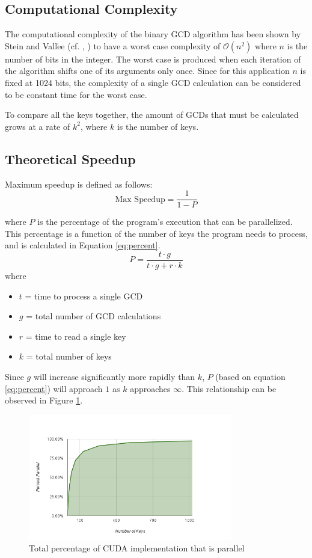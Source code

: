 \documentclass[12pt]{ucthesis}
\begin{document}
\subsection{Computational Complexity}
The computational complexity of the binary GCD algorithm has been shown by 
Stein and Vall$\acute{\text{e}}$e (cf. \cite{stein1967computational}, 
\cite{vallee1998complete}) to have a worst case complexity of $\mathcal{O}(n^2)$ 
where $n$ is the number of bits in the integer. The worst case is produced 
when each iteration of the algorithm shifts one of its arguments only once. 
Since for this application $n$ is fixed at 1024 bits, the complexity of a 
single GCD calculation can be considered to be constant time for the worst case.

To compare all the keys together, the amount of GCDs that must be calculated 
grows at a rate of $k^2$, where $k$ is the number of keys.

\subsection{Theoretical Speedup}
Maximum speedup is defined as follows:
\begin{equation}
   \mbox{Max Speedup} = \frac{1}{1 - P}
   \label{eq:speed}
\end{equation}

where $P$ is the percentage of the program's execution that can be parallelized.
This percentage is a function of the number of keys the program needs to 
process, and is calculated in Equation \ref{eq:percent}.
\begin{equation}
P = \frac{t \cdot g}{t \cdot g + r \cdot k}
   \label{eq:percent}
\end{equation}
where
\begin{itemize}
   \item $t$ = time to process a single GCD
   \item $g$ = total number of GCD calculations
   \item $r$ = time to read a single key
   \item $k$ = total number of keys
\end{itemize}

Since $g$ will increase significantly more rapidly than $k$, $P$ (based on 
equation \ref{eq:percent}) will approach $1$ as $k$ approaches 
$\infty$. This relationship can be observed in Figure \ref{fig:parPercent}.

\begin{figure}
   \centering
   \includegraphics[width=3.5in]{chart_7.png}
   \caption{Total percentage of CUDA implementation that is parallel}
   \label{fig:parPercent}
\end{figure}
\end{document}
